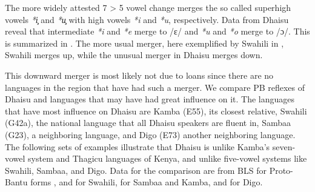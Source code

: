 \documentclass[output=paper,colorlinks,citecolor=brown]{langscibook}
\begin{document}
The more widely attested 7 > 5 vowel change merges the so called superhigh vowels \textit{*i̧} and \textit{*u̧} with high vowels \textit{*i} and \textit{*u}, respectively. Data from Dhaisu reveal that intermediate \textit{*i} and \textit{*e }merge to /ɛ/ and \textit{*u} and \textit{*o} merge to /ɔ/. This is summarized in . The more usual merger, here exemplified by Swahili in , Swahili merges up, while the unusual merger in Dhaisu merges down.

\begin{figure}
\begin{floatrow}
\captionsetup{margin=.05\linewidth}%
%
\end{floatrow}
\end{figure}

This downward merger is most likely not due to loans since there are no languages in the region that have had such a merger. 
We compare PB reflexes of Dhaisu and languages that may have had great influence on it. The languages that have most influence on Dhaisu are Kamba (E55), its closest relative, Swahili (G42a), the national language that all Dhaisu speakers are fluent in, Sambaa (G23), a neighboring language, and Digo (E73) another neighboring language. The following sets of examples illustrate that Dhaisu is unlike Kamba's seven-vowel system and Thagicu languages of Kenya, and unlike five-vowel systems like Swahili, Sambaa, and Digo. Data for the comparison are from BLS for Proto-Bantu forms  \citet{BastinEtAl2002}, \citet{NurseHinnebusch1993}  and \citet{TUKI1996} for Swahili, \citet{NursePhilippson1975} for  Sambaa and Kamba, and \citet{MwalonyaEtAl2004} for Digo.
\end{document}
